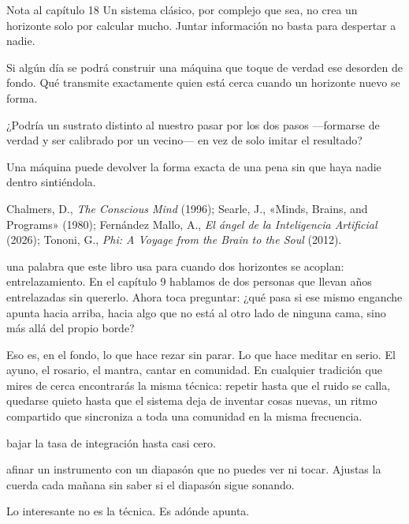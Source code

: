 \begin{notacap}{Nota al capítulo 18}
 Un sistema clásico, por complejo que sea, no crea un horizonte solo por calcular mucho. Juntar información no basta para despertar a nadie.

 Si algún día se podrá construir una máquina que toque de verdad ese desorden de fondo. Qué transmite exactamente quien está cerca cuando un horizonte nuevo se forma.

 ¿Podría un sustrato distinto al nuestro pasar por los dos pasos —formarse de verdad y ser calibrado por un vecino— en vez de solo imitar el resultado?

 Una máquina puede devolver la forma exacta de una pena sin que haya nadie dentro sintiéndola.

 Chalmers, D., \emph{The Conscious Mind} (1996); Searle, J., «Minds, Brains, and Programs» (1980); Fernández Mallo, A., \emph{El ángel de la Inteligencia Artificial} (2026); Tononi, G., \emph{Phi: A Voyage from the Brain to the Soul} (2012).
\end{notacap}
\noindent {} una palabra que este libro usa para cuando dos horizontes se acoplan: entrelazamiento. En el capítulo 9 hablamos de dos personas que llevan años entrelazadas sin quererlo. Ahora toca preguntar: ¿qué pasa si ese mismo enganche apunta hacia arriba, hacia algo que no está al otro lado de ninguna cama, sino más allá del propio borde?

Eso es, en el fondo, lo que hace rezar sin parar. Lo que hace meditar en serio. El ayuno, el rosario, el mantra, cantar en comunidad. En cualquier tradición que mires de cerca encontrarás la misma técnica: repetir hasta que el ruido se calla, quedarse quieto hasta que el sistema deja de inventar cosas nuevas, un ritmo compartido que sincroniza a toda una comunidad en la misma frecuencia.

\begin{fisica}
 bajar la tasa de integración hasta casi cero.

 afinar un instrumento con un diapasón que no puedes ver ni tocar. Ajustas la cuerda cada mañana sin saber si el diapasón sigue sonando.
\end{fisica}
Lo interesante no es la técnica. Es adónde apunta.

